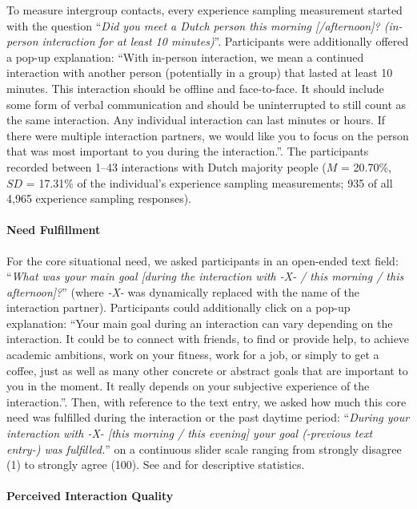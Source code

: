 To measure intergroup contacts, every experience sampling measurement
started with the question
``\textit{Did you meet a Dutch person this morning [/afternoon]? (in-person interaction for at least 10 minutes)}''.
Participants were additionally offered a pop-up explanation: ``With
in-person interaction, we mean a continued interaction with another
person (potentially in a group) that lasted at least 10 minutes. This
interaction should be offline and face-to-face. It should include some
form of verbal communication and should be uninterrupted to still count
as the same interaction. Any individual interaction can last minutes or
hours. If there were multiple interaction partners, we would like you to
focus on the person that was most important to you during the
interaction.''. The participants recorded between 1--43 interactions
with Dutch majority people (\(M\) = 20.70\%, \(SD\) = 17.31\% of the
individual's experience sampling measurements; 935 of all 4,965
experience sampling responses).

\paragraph{Need Fulfillment}

For the core situational need, we asked participants in an open-ended
text field:
``\textit{What was your main goal [during the interaction with -X- / this morning / this afternoon]?}''
(where \textit{-X-} was dynamically replaced with the name of the
interaction partner). Participants could additionally click on a pop-up
explanation: ``Your main goal during an interaction can vary depending
on the interaction. It could be to connect with friends, to find or
provide help, to achieve academic ambitions, work on your fitness, work
for a job, or simply to get a coffee, just as well as many other
concrete or abstract goals that are important to you in the moment. It
really depends on your subjective experience of the interaction.''.
Then, with reference to the text entry, we asked how much this core need
was fulfilled during the interaction or the past daytime period:
``\textit{During your interaction with -X- [this morning / this evening] your goal (-previous text entry-) was fulfilled.}''
on a continuous slider scale ranging from strongly disagree (1) to
strongly agree (100). See  and
 for descriptive statistics.

\paragraph{Perceived Interaction Quality}

